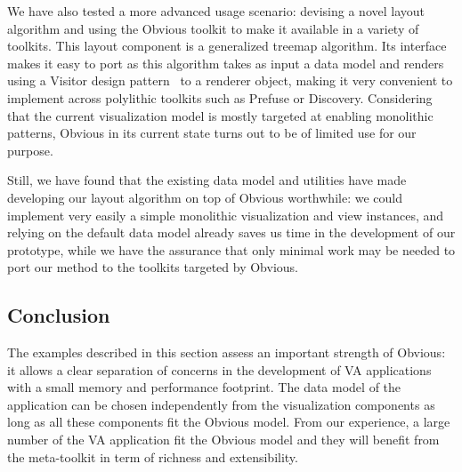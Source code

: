 We have also tested a more advanced usage scenario: devising
a novel layout algorithm and using the Obvious toolkit to make it
available in a variety of toolkits. This layout component is a
generalized treemap algorithm.
Its interface makes it easy to port as this algorithm takes as input a
data model and renders using a Visitor design
pattern~\cite{DesignPatterns} to a renderer object, making it very
convenient to implement across polylithic toolkits such as Prefuse or
Discovery.  Considering that the current visualization model is mostly
targeted at enabling monolithic patterns, Obvious in its current state
turns out to be of limited use for our purpose.

Still, we have found that the existing data model and utilities have
made developing our layout algorithm on top of Obvious worthwhile: we
could implement very easily a simple monolithic visualization and
view instances, and relying on the default data model already saves us
time in the development of our prototype, while we have the assurance
that only minimal work may be needed to port our method to the
toolkits targeted by Obvious.


\subsection{Conclusion}

The examples described in this section assess an important strength of
Obvious: it allows a clear separation of concerns in the development
of VA applications with a small memory and performance footprint.  The
data model of the application can be chosen independently from the
visualization components as long as all these components fit the
Obvious model.  From our experience, a large number of the VA
application fit the Obvious model and they will benefit from the
meta-toolkit in term of richness and extensibility.

